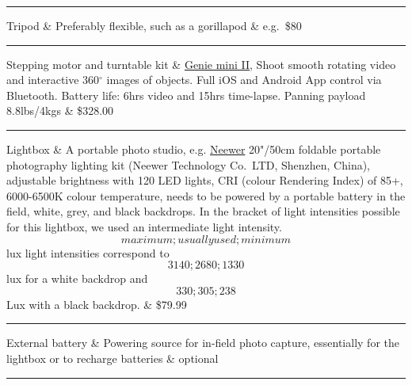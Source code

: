 \documentclass[
]{book}
\theoremstyle{definition}
\theoremstyle{definition}
\theoremstyle{definition}
\theoremstyle{definition}
\theoremstyle{remark}
\begin{document}
\begin{center}\rule{0.5\linewidth}{0.5pt}\end{center}

Tripod \& Preferably flexible, such as a gorillapod \& e.g.~\$80\\

\begin{center}\rule{0.5\linewidth}{0.5pt}\end{center}

Stepping motor and turntable kit \& \href{https://www.bhphotovideo.com/c/product/1486043-REG/syrp_sykit_0043_genie_mini_ii_turntable.html/quick-compare}{Genie mini
II},
Shoot smooth rotating video and interactive 360\({^\circ}\) images of
objects. Full iOS and Android App control via Bluetooth. Battery life:
6hrs video and 15hrs time-lapse. Panning payload 8.8lbs/4kgs \& \$328.00\\

\begin{center}\rule{0.5\linewidth}{0.5pt}\end{center}

Lightbox \& A portable photo studio, e.g.
\href{https://neewer.com/products/lighting-studio-10094456?_pos=2\&_sid=bde9f6ddb\&_ss=r}{Neewer}
20"/50cm foldable portable photography lighting kit (Neewer Technology
Co.~LTD, Shenzhen, China), adjustable brightness with 120 LED lights,
CRI (colour Rendering Index) of 85+, 6000-6500K colour temperature,
needs to be powered by a portable battery in the field, white, grey, and
black backdrops. In the bracket of light intensities possible for this
lightbox, we used an intermediate light intensity. \[maximum;usually
used; minimum\] lux light intensities correspond to \[3140;2680;1330\]
lux for a white backdrop and \[330;305;238\] Lux with a black backdrop.
\& \$79.99\\

\begin{center}\rule{0.5\linewidth}{0.5pt}\end{center}

External battery \& Powering source for in-field photo capture,
essentially for the lightbox or to recharge batteries \& optional\\

\begin{center}\rule{0.5\linewidth}{0.5pt}\end{center}
\end{document}
